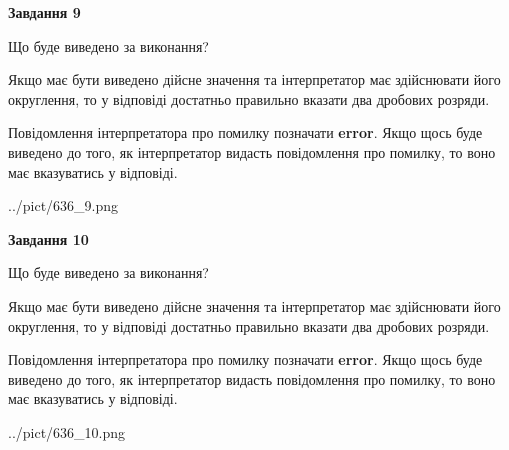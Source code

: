 \documentclass[12pt, ukrainian]{article}
\begin{document}
{\begin {Large}
{\begin {center}\textbf{Завдання 9}\end {center}}\par
Що буде виведено за виконання? \par

Якщо має бути виведено дійсне значення та інтерпретатор має здійснювати його округлення, 
то у відповіді достатньо правильно вказати два дробових розряди.

Повідомлення інтерпретатора про помилку позначати \textbf{error}.
Якщо щось буде виведено до того, як інтерпретатор видасть повідомлення про помилку, 
то воно має вказуватись у відповіді. \par

\begin{center}
	{../pict/636_9.png}
\end{center}
\newpage

{\begin {center}\textbf{Завдання 10}\end {center}}\par
Що буде виведено за виконання? \par

Якщо має бути виведено дійсне значення та інтерпретатор має здійснювати його округлення, 
то у відповіді достатньо правильно вказати два дробових розряди.

Повідомлення інтерпретатора про помилку позначати \textbf{error}.
Якщо щось буде виведено до того, як інтерпретатор видасть повідомлення про помилку, 
то воно має вказуватись у відповіді. \par

\begin{center}
	{../pict/636_10.png}
\end{center}
\newpage

\end {Large}}
\end{document}
